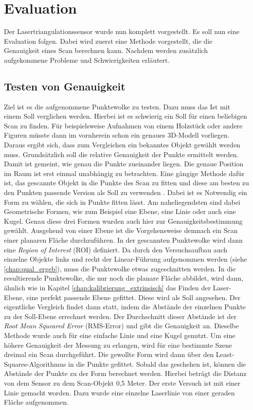 \section{Evaluation}
		
		Der Lasertriangulationssensor wurde nun komplett vorgestellt. Es soll nun eine Evaluation folgen. Dabei wird zuerst eine Methode vorgestellt, die die Genauigkeit eines Scan berechnen kann. Nachdem werden zusätzlich aufgekommene Probleme und Schwierigkeiten erläutert.   
		\subsection{Testen von Genauigkeit}
		Ziel ist es die aufgenommene Punktewolke zu testen. Dazu muss das \glqq Ist\grqq{} mit einem \glqq Soll\grqq{} verglichen werden. Hierbei ist es schwierig ein \glqq Soll\grqq{} für einen beliebigen Scan zu finden. Für beispielsweise Aufnahmen von einem Holzstück oder andere Figuren müsste dann im vornherein schon ein genaues 3D-Modell vorliegen. Daraus ergibt sich, dass zum Vergleichen ein bekanntes Objekt gewählt werden muss. Grundsätzlich soll die relative Genauigkeit der Punkte ermittelt werden. Damit ist gemeint, wie genau die Punkte zueinander liegen. Die genaue Position im Raum ist erst einmal unabhängig zu betrachten. Eine gängige Methode dafür ist, das gescannte Objekt in die Punkte des Scan zu fitten und diese am besten zu den Punkten passende Version als \glqq Soll\grqq{} zu verwenden \citep{bart_accuracy_nodate} \citep{song_multi-view_2019}. Dabei ist es Notwendig ein Form zu wählen, die sich in Punkte fitten lässt. Am naheliegendsten sind dabei Geometrische Formen, wie zum Beispiel eine Ebene, eine Linie oder auch eine Kugel. Genau diese drei Formen wurden auch hier zur Genauigkeitsbestimmung gewählt. Ausgehend von einer Ebene ist die  Vorgehensweise demnach ein Scan einer planaren Fläche durchzuführen. In der gescannten Punktewolke wird dann eine \textit{Region of Interest} (ROI) definiert. Da durch den Versuchsaufbau auch einzelne Objekte links und recht der Linear-Führung aufgenommen werden (siehe \ref{chap:qual_ergeb}), muss die Punktewolke etwas zugeschnitten werden. In die resultierende Punktewolke, die nur noch die planare Fläche abbildet, wird dann, ähnlich wie in Kapitel \ref{chap:kalibrierung_extrinsisch} das Finden der Laser-Ebene, eine perfekt passende Ebene gefittet. Diese wird als \glqq Soll\grqq{} angesehen. Der eigentliche Vergleich findet dann statt, indem die Abstände der einzelnen Punkte zu der \glqq Soll\grqq-Ebene errechnet werden. Der Durchschnitt dieser Abstände ist der \textit{Root Mean Squeared Error} (RMS-Error) und gibt die Genauigkeit an. Dieselbe Methode wurde auch für eine einfache Linie und eine Kugel genutzt. Um eine höhere Genauigkeit der Messung zu erlangen, wird für eine bestimmte Szene dreimal ein Scan durchgeführt. Die gewollte Form wird dann über den Least-Squares-Algorithmus in die Punkte gefittet. Sobald das geschehen ist, können die Abstände der Punkte zu der Form berechnet werden. Hierbei beträgt die Distanz von dem Sensor zu dem Scan-Objekt 0,5 Meter. \newline
		Der erste Versuch ist mit einer Linie gemacht worden. Dazu wurde eine einzelne Laserlinie von einer geraden Fläche aufgenommen.  
		
